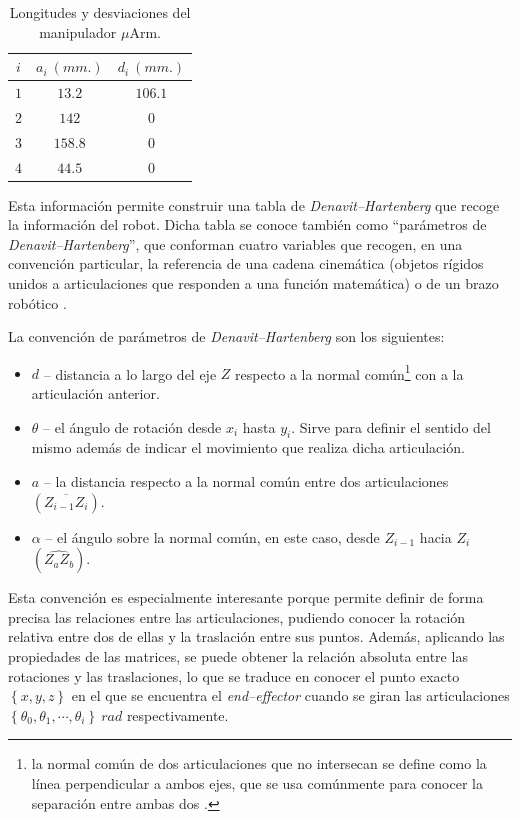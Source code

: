 \begin{table}[ht]
\begin{minipage}{.49\linewidth}
\begin{tabular}{|| c | c c ||}
            $i$ & $a_i~(mm.)$ & $d_i~(mm.)$ \\ [0.5ex]
            \hline\hline
            $1$ & $13.2$      & $106.1$     \\
            \hline
            $2$ & $142$       & $0$         \\
            \hline
            $3$ & $158.8$     & $0$         \\
            \hline
            $4$ & $44.5$      & $0$         \\ [1ex]
            \hline
        \end{tabular}
        \caption{Longitudes y desviaciones del manipulador $\mu$Arm.}
        \label{tab:uArm-ld-values}
    \end{minipage}
\end{table}

Esta información permite construir una tabla de \textit{Denavit--Hartenberg} que
recoge la información del robot. Dicha tabla se conoce también como ``parámetros de
\textit{Denavit--Hartenberg}'', que conforman cuatro variables que recogen, en una
convención particular, la referencia de una cadena cinemática (objetos rígidos unidos
a articulaciones que responden a una función matemática) o de un brazo robótico \cite{DenavitHartenbergParameters2020}.

La convención de parámetros de \textit{Denavit--Hartenberg} son los siguientes:
\begin{itemize}
    \item $d$ -- distancia a lo largo del eje $Z$ respecto a la normal común\footnote{la normal
              común de dos articulaciones que no intersecan se define como la línea perpendicular a
              ambos ejes, que se usa comúnmente para conocer la separación entre ambas dos \cite{CommonNormalRobotics2017}.}
          con a la articulación anterior.
    \item $\theta$ -- el ángulo de rotación desde $x_i$ hasta $y_i$. Sirve para definir
          el sentido del mismo además de indicar el movimiento que realiza dicha articulación.
    \item $a$ -- la distancia respecto a la normal común entre dos articulaciones $\left(\overline{Z_{i - 1}Z_i}\right)$.
    \item $\alpha$ -- el ángulo sobre la normal común, en este caso, desde $Z_{i - 1}$ hacia $Z_i$ $\left(\widehat{Z_aZ_b}\right)$.
\end{itemize}

Esta convención es especialmente interesante porque permite definir de forma precisa
las relaciones entre las articulaciones, pudiendo conocer la rotación relativa entre
dos de ellas y la traslación entre sus puntos. Además, aplicando las propiedades
de las matrices, se puede obtener la relación absoluta entre las rotaciones y las
traslaciones, lo que se traduce en conocer el punto exacto $\left\{x, y, z\right\}$ en el que se encuentra el
\textit{end--effector} cuando se giran las articulaciones
$\left\{\theta_0, \theta_1, \cdots, \theta_i\right\}~rad$ respectivamente.


